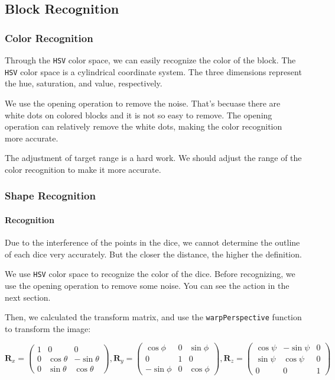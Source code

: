 \documentclass{article}
\begin{document}
\subsection{Block Recognition}

\subsubsection{Color Recognition}
Through the \texttt{HSV} color space, we can easily recognize the color of the block. The \texttt{HSV} color space is a cylindrical coordinate system. The three dimensions represent the hue, saturation, and value, respectively.

We use the opening operation to remove the noise. That's becuase there are white dots on colored blocks and it is not so easy to remove. The opening operation can relatively remove the white dots, making the color recognition more accurate.

The adjustment of target range is a hard work. We should adjust the range of the color recognition to make it more accurate.

\subsubsection{Shape Recognition}

\paragraph{Recognition}

Due to the interference of the points in the dice, we cannot determine the outline of each dice very accurately. But the closer the distance, the higher the definition.

We use \texttt{HSV} color space to recognize the color of the dice. Before recognizing, we use the opening operation to remove some noise. You can see the action in the next section.

Then, we calculated the transform matrix, and use the \texttt{warpPerspective} function to transform the image:

\begin{equation}
  \boldsymbol{R}_x=
  \left(
  \begin{matrix}
    1 & 0 & 0 \\
    0 & \cos\theta & -\sin\theta \\
    0 & \sin\theta & \cos\theta
  \end{matrix}
  \right),
  \boldsymbol{R}_y=
  \left(
  \begin{matrix}
    \cos\phi & 0 & \sin\phi \\
    0 & 1 & 0 \\
    -\sin\phi & 0 & \cos\phi
  \end{matrix}
  \right),
  \boldsymbol{R}_z=
  \left(
  \begin{matrix}
    \cos\psi & -\sin\psi & 0 \\
    \sin\psi & \cos\psi & 0 \\
    0 & 0 & 1
  \end{matrix}
  \right)
\end{equation}
\end{document}
